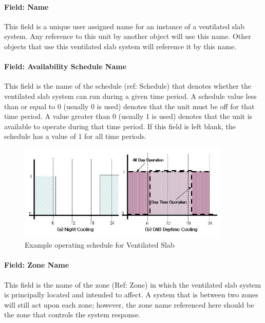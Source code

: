 \paragraph{Field: Name}\label{field-name-10-012}

This field is a unique user assigned name for an instance of a ventilated slab system. Any reference to this unit by another object will use this name. Other objects that use this ventilated slab system will reference it by this name.

\paragraph{Field: Availability Schedule Name}\label{field-availability-schedule-name-9-001}

This field is the name of the schedule (ref: Schedule) that denotes whether the ventilated slab system can run during a given time period. A schedule value less than or equal to 0 (usually 0 is used) denotes that the unit must be off for that time period. A value greater than 0 (usually 1 is used) denotes that the unit is available to operate during that time period. If this field is left blank, the schedule has a value of 1 for all time periods.

\begin{figure}[hbtp] %
\centering
\includegraphics[width=0.9\textwidth, height=0.9\textheight, keepaspectratio=true]{media/image322.png}
\caption{Example operating schedule for Ventilated Slab \protect \label{fig:example-operating-schedule-for-ventilated}}
\end{figure}

\paragraph{Field: Zone Name}\label{field-zone-name-4-004}

This field is the name of the zone (Ref: Zone) in which the ventilated slab system is principally located and intended to affect. A system that is between two zones will still act upon each zone; however, the zone name referenced here should be the zone that controls the system response.

